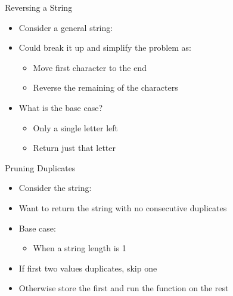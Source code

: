 \documentclass[pdf, aspectratio=169, 12pt]{beamer}
\begin{document}
\begin{frame}{Reversing a String}
	\begin{itemize}[<+->]
		\item Consider a general string:
			\begin{center}
			\end{center}
		\item Could break it up and simplify the problem as:
			\begin{itemize}
				\item Move first character to the end
				\item Reverse the remaining of the characters
			\begin{center}
			\end{center}
			\end{itemize}
		\item What is the base case?
			\begin{itemize}
				\item Only a single letter left
				\item Return just that letter
			\end{itemize}
	\end{itemize}
\end{frame}

\begin{frame}{Pruning Duplicates}
	\begin{itemize}
		\item Consider the string:
			\begin{center}
			\end{center}
		\item Want to return the string with no consecutive duplicates
		\item Base case:
			\begin{itemize}
				\item When a string length is 1
			\end{itemize}
		\item If first two values duplicates, skip one
		\item Otherwise store the first and run the function on the rest
	\end{itemize}
\end{frame}
\end{document}
